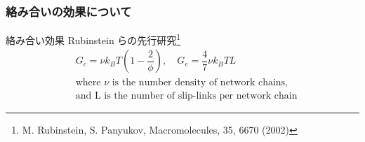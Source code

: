 \documentclass[12pt, dvipdfmx]{beamer}
\begin{document}
\begin{frame}
    \frametitle{絡み合いの効果について}
	\vspace{-2mm}
	\begin{alertblock}{絡み合い効果}
			\small
			Rubinstein らの先行研究\footnote{
				\scriptsize{M. Rubinstein, S. Panyukov, Macromolecules, 35, 6670 (2002)}
				}
			\vspace{-3mm}
			\scriptsize
			\begin{align*}
				&G_c = \nu k_B T \left(1-\dfrac{2}{\phi} \right), \quad G_e = \dfrac{4}{7} \nu k_B T L \\
				&\text{where $\nu$ is the number density of network chains,} \\
				& \text{and L is the number of slip-links per network chain}
			\end{align*}
					


\end{alertblock}
\end{frame}
\end{document}
